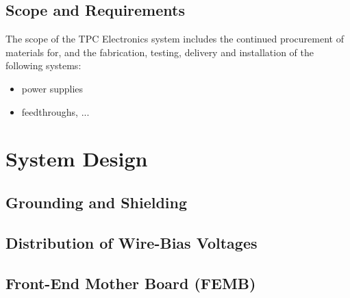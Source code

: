 
\subsection{Scope and Requirements}
\label{sec:fdsp-tpc-elec-ov-scope}

The scope of the TPC Electronics system includes the continued procurement of materials for, and the fabrication, testing, delivery and installation of the following systems: 


\begin{itemize}
\item power supplies 
\item feedthroughs, ...
\end{itemize}



\section{System Design}
\label{sec:fdsp-tpc-elec-design}




\subsection{Grounding and Shielding}
\label{sec:fdsp-tpc-elec-design-ground}

\subsection{Distribution of Wire-Bias Voltages}
\label{sec:fdsp-tpc-elec-design-bias}

\subsection{Front-End Mother Board (FEMB)}
\label{sec:fdsp-tpc-elec-design-femb}

